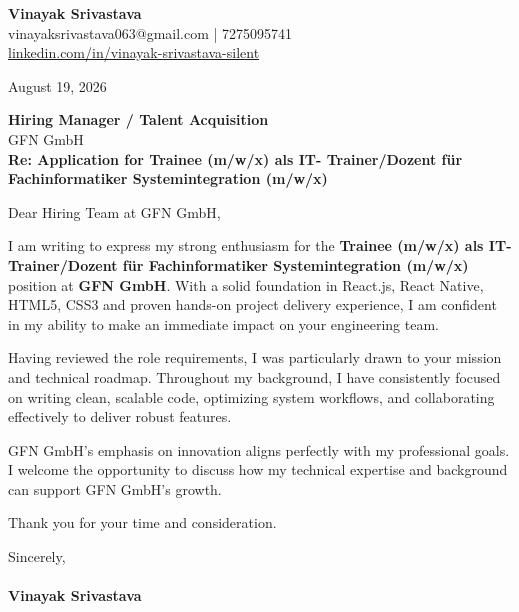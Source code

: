 \documentclass[11pt,a4paper]{article}
\begin{document}
\thispagestyle{empty}

{\Large \textbf{Vinayak Srivastava}}\\
vinayaksrivastava063@gmail.com | 7275095741 \\
\url{linkedin.com/in/vinayak-srivastava-silent}

\vspace{1em}
\hfill August 19, 2026

\textbf{Hiring Manager / Talent Acquisition}\\
GFN GmbH\\

\vspace{1.5em}
\textbf{Re: Application for Trainee (m/w/x) als IT- Trainer/Dozent für Fachinformatiker Systemintegration (m/w/x)}

\vspace{1em}
Dear Hiring Team at GFN GmbH,

I am writing to express my strong enthusiasm for the \textbf{Trainee (m/w/x) als IT- Trainer/Dozent für Fachinformatiker Systemintegration (m/w/x)} position at \textbf{GFN GmbH}. With a solid foundation in React.js, React Native, HTML5, CSS3 and proven hands-on project delivery experience, I am confident in my ability to make an immediate impact on your engineering team.

Having reviewed the role requirements, I was particularly drawn to your mission and technical roadmap. Throughout my background, I have consistently focused on writing clean, scalable code, optimizing system workflows, and collaborating effectively to deliver robust features.

GFN GmbH's emphasis on innovation aligns perfectly with my professional goals. I welcome the opportunity to discuss how my technical expertise and background can support GFN GmbH's growth.

Thank you for your time and consideration.

\vspace{1.5em}
Sincerely,\\
\vspace{1em}\\
\textbf{Vinayak Srivastava}
\end{document}
